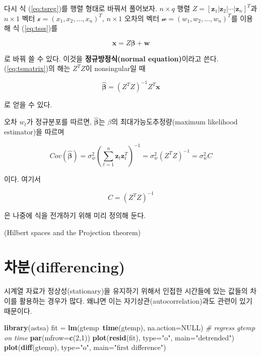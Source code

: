 \documentclass[b5paper,]{book}
\makeatletter
\newenvironment{Shaded}{\begin{snugshade}}{\end{snugshade}}
\newcommand{\KeywordTok}[1]{\textcolor[rgb]{0.13,0.29,0.53}{\textbf{{#1}}}}
\newcommand{\DataTypeTok}[1]{\textcolor[rgb]{0.13,0.29,0.53}{{#1}}}
\newcommand{\DecValTok}[1]{\textcolor[rgb]{0.00,0.00,0.81}{{#1}}}
\newcommand{\StringTok}[1]{\textcolor[rgb]{0.31,0.60,0.02}{{#1}}}
\newcommand{\CommentTok}[1]{\textcolor[rgb]{0.56,0.35,0.01}{\textit{{#1}}}}
\newcommand{\OtherTok}[1]{\textcolor[rgb]{0.56,0.35,0.01}{{#1}}}
\newcommand{\NormalTok}[1]{{#1}}
\newenvironment{kframe}{%
\medskip{}
\setlength{\fboxsep}{.8em}
 \def\at@end@of@kframe{}%
 \ifinner\ifhmode%
  \def\at@end@of@kframe{\end{minipage}}%
  \begin{minipage}{\columnwidth}%
 \fi\fi%
 \def\FrameCommand##1{\hskip\@totalleftmargin \hskip-\fboxsep
 \colorbox{shadecolor}{##1}\hskip-\fboxsep
     \hskip-\linewidth \hskip-\@totalleftmargin \hskip\columnwidth}%
 \MakeFramed {\advance\hsize-\width
   \@totalleftmargin\z@ \linewidth\hsize
   \@setminipage}}%
 {\par\unskip\endMakeFramed%
 \at@end@of@kframe}
\renewenvironment{Shaded}{\begin{kframe}}{\end{kframe}}
\theoremstyle{definition}
\theoremstyle{definition}
\theoremstyle{definition}
\theoremstyle{remark}
\makeatother
\begin{document}
다시 식 (\eqref{eq:tsreg})를 행렬 형태로 바꿔서 풀어보자. \(n\times q\)
행렬
\(Z= [\mathbf{z}_{1} | \mathbf{z}_{2} | \cdots | \mathbf{z}_{n} ]^{T}\)과
\(n \times 1\) 벡터 \(\mathcal{x}=(x_{1},x_{2},\ldots , x_{n})^{T}\),
\(n \times 1\) 오차의 벡터
\(\mathcal{w}=(w_{1},w_{2}, \ldots, w_{n})^{T}\)를 이용해 식
(\eqref{eq:tsss})를

\begin{equation}\label{eq:tsmatrix}
\mathbf{x}=Z\boldsymbol{\beta}+\mathbf{w}
\end{equation}

로 바꿔 쓸 수 있다. 이것을 \textbf{정규방정식(normal equation)}이라고
쓴다. (\eqref{eq:tsmatrix})의 해는 \(Z^{T}Z\)이 nonsingular일 때

\[\hat{\boldsymbol{\beta}}=(Z^{T}Z)^{-1}Z^{T}\mathbf{x}\]

로 얻을 수 있다.

오차 \(w_{t}\)가 정규분포를 따르면, \(\hat{\boldsymbol{\beta}}\)는
\(\beta\)의 최대가능도추정량(maximum likelihood estimator)을 따르며

\[Cov(\hat{\boldsymbol{\beta}})=\sigma_{w}^{2}(\sum_{t=1}^{n}\mathbf{z}_{t}\mathbf{z}_{t}^{T})^{-1}=\sigma_{w}^{2}(Z^{T}Z)^{-1}=\sigma_{w}^{2}C\]

이다. 여기서

\[C=(Z^{T}Z)^{-1}\]

은 나중에 식을 전개하기 위해 미리 정의해 둔다.

(Hilbert spaces and the Projection theorem)

\section{차분(differencing)}\label{differencing}

시계열 자료가 정상성(stationary)을 유지하기 위해서 인접한 시간들에 있는
값들의 차이를 활용하는 경우가 많다. 왜냐면 이는
자기상관(autocorrelation)과도 관련이 있기 때문이다.

\begin{Shaded}
\begin{Highlighting}[]
\KeywordTok{library}\NormalTok{(astsa)}
\NormalTok{fit =}\StringTok{ }\KeywordTok{lm}\NormalTok{(gtemp~}\KeywordTok{time}\NormalTok{(gtemp), }\DataTypeTok{na.action=}\OtherTok{NULL}\NormalTok{) }\CommentTok{# regress gtemp on time}
\KeywordTok{par}\NormalTok{(}\DataTypeTok{mfrow=}\KeywordTok{c}\NormalTok{(}\DecValTok{2}\NormalTok{,}\DecValTok{1}\NormalTok{))}
\KeywordTok{plot}\NormalTok{(}\KeywordTok{resid}\NormalTok{(fit), }\DataTypeTok{type=}\StringTok{"o"}\NormalTok{, }\DataTypeTok{main=}\StringTok{"detrended"}\NormalTok{)}
\KeywordTok{plot}\NormalTok{(}\KeywordTok{diff}\NormalTok{(gtemp), }\DataTypeTok{type=}\StringTok{"o"}\NormalTok{, }\DataTypeTok{main=}\StringTok{"first difference"}\NormalTok{)}
\end{Highlighting}
\end{Shaded}
\end{document}
